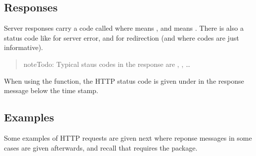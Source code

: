 \documentclass[a4paper,12pt,english]{sphinxhowto}
\begin{document}
\subsection{Responses}
\label{\detokenize{Sciencedata_dk:responses}}
Server responses carry a code called  where  means ,
and  means . There is also a status code like  for server
error, and  for redirection (and where codes  are just informative).
\begin{quote}

\begin{sphinxadmonition}{note}{\label{\detokenize{Sciencedata_dk:id5}}Todo:}
Typical staus codes in the response are , , …
\end{sphinxadmonition}
\end{quote}

When using the  function, the HTTP status code is given under  in the
response message below the time stamp.



\subsection{Examples}
\label{\detokenize{Sciencedata_dk:examples}}
Some examples of HTTP requests are given next where reponse messages in some cases are given
afterwards, and recall that  requires the  package.

\begin{sphinxVerbatim}[commandchars=\\\{\},formatcom=\footnotesize]
   
\end{sphinxVerbatim}

\end{document}
